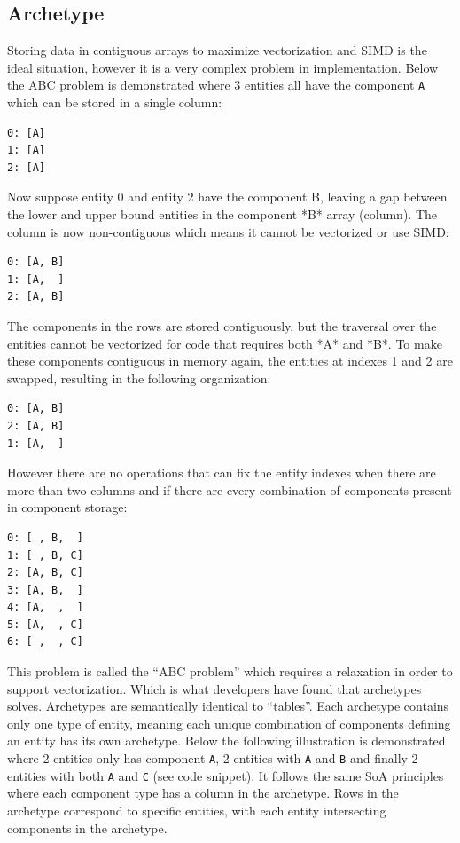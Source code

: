 \documentclass[openany, amssymb, psamsfonts]{amsart}
\theoremstyle{definition}
\numberwithin{equation}{section}
\begin{document}
\subsection{Archetype}
Storing data in contiguous arrays to maximize vectorization and SIMD is the ideal situation, 
however it is a very complex problem in implementation. Below the ABC problem\cite{Anderson} 
is demonstrated where 3 entities all have the component \texttt{A} which can be stored in a single 
column:

\begin{verbatim}
0: [A]
1: [A]
2: [A]
\end{verbatim}

Now suppose entity 0 and entity 2 have the component B, leaving a gap between the lower and upper bound entities in the component *B* array (column). The column is now non-contiguous which means it cannot be vectorized or use SIMD:

\begin{verbatim}
0: [A, B]
1: [A,  ]
2: [A, B]
\end{verbatim}

The components in the rows are stored contiguously, but the traversal over the entities cannot be vectorized for code that requires both *A* and *B*. To make these components contiguous in memory again, the entities at indexes 1 and 2 are swapped, resulting in the following organization:

\begin{verbatim}
0: [A, B]
2: [A, B]
1: [A,  ]
\end{verbatim}

However there are no operations that can fix the entity indexes when there are more than two columns and if there are every combination of components present in component storage:

\begin{verbatim}
0: [ , B,  ]
1: [ , B, C]
2: [A, B, C]
3: [A, B,  ]
4: [A,  ,  ] 
5: [A,  , C]
6: [ ,  , C]
\end{verbatim}

This problem is called the ``ABC problem'' which requires a relaxation in order to support 
vectorization. Which is what developers have found that archetypes solves.\cite{Anderson} 
Archetypes are semantically identical to ``tables''. Each archetype contains only one type of 
entity, meaning each unique combination of components defining an entity has its own archetype. 
Below the following illustration is demonstrated where 2 entities only has component \texttt{A}, 
2 entities with \texttt{A} and \texttt{B} and finally 2 entities with both \texttt{A} 
and \texttt{C} (see code snippet). It follows the same SoA principles where each component 
type has a column in the archetype. Rows in the archetype correspond to specific entities, with each entity intersecting components in the archetype. 
\end{document}
